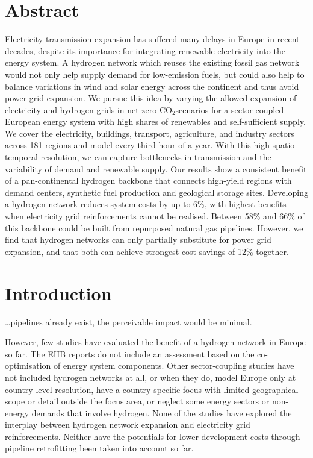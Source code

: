 \documentclass{article}
\def\co{CO${}_2$}
\begin{document}
\section*{Abstract}

Electricity transmission expansion has suffered many delays in Europe in recent
decades, despite its importance for integrating renewable electricity into the
energy system. A hydrogen network which reuses the existing fossil gas network
would not only help supply demand for low-emission fuels, but could also help to
balance variations in wind and solar energy across the continent and thus avoid
power grid expansion. We pursue this idea by varying the allowed expansion of
electricity and hydrogen grids in net-zero \co scenarios for a sector-coupled
European energy system with high shares of renewables and self-sufficient
supply. We cover the electricity, buildings, transport, agriculture, and
industry sectors across 181 regions and model every third hour of a year. With
this high spatio-temporal resolution, we can capture bottlenecks in transmission
and the variability of demand and renewable supply. Our results show a
consistent benefit of a pan-continental hydrogen backbone that connects
high-yield regions with demand centers, synthetic fuel production and geological
storage sites. Developing a hydrogen network reduces system costs by up to 6\%,
with highest benefits when electricity grid reinforcements cannot be realised.
Between 58\% and 66\% of this backbone could be built from repurposed natural gas
pipelines. However, we find that hydrogen networks can only partially substitute
for power grid expansion, and that both can achieve strongest cost savings of
12\% together.

\section*{Introduction}

\dots pipelines already exist, the perceivable impact would be minimal.

However, few studies have evaluated the benefit of a hydrogen network in Europe
so far. The EHB reports do not include an assessment based on the
co-optimisation of energy system components. Other sector-coupling studies have
not included hydrogen networks at all, or when they do, model Europe only at
country-level resolution, have a country-specific focus with limited
geographical scope or detail outside the focus area, or neglect some energy
sectors or non-energy demands that involve hydrogen. None of the studies have
explored the interplay between hydrogen network expansion and electricity grid
reinforcements. Neither have the potentials for lower development costs through
pipeline retrofitting been taken into account so far.
\end{document}
